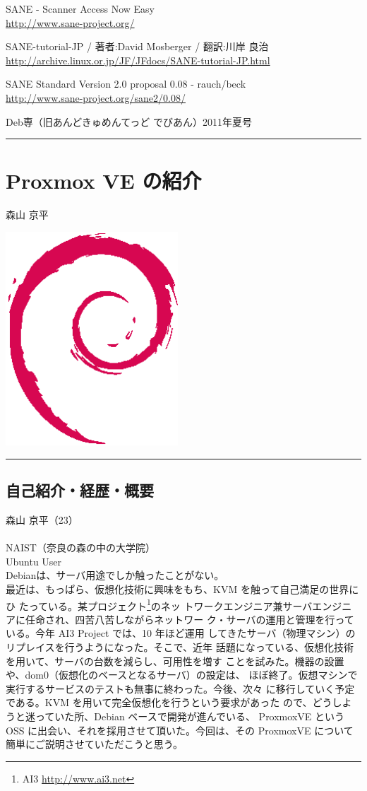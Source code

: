 \documentclass[mingoth,a4paper]{jsarticle}
\renewcommand{\dancersection}[2]{%
\newpage
Deb専（旧あんどきゅめんてっど でびあん）2011年夏号
%
\vspace{0.1mm}\\
{\color{dancerdarkblue}\rule{\hsize}{2mm}}

%
%
\begin{minipage}[t]{0.6\hsize}
\color{dancerdarkblue}
\vspace{1cm}
\section{#1}
\hfill{}#2\\
\end{minipage}
\begin{minipage}[t]{0.4\hsize}
\vspace{-2cm}
\hfill{}\includegraphics[height=8cm]{image200502/openlogo-nd.eps}\\
\vspace{-5cm}
\end{minipage}
%
{\color{dancerlightblue}\rule{0.66\hsize}{2mm}}
%
\vspace{2cm}
}
\begin{document}
\begin{thebibliography}{0}
 SANE - Scanner Access Now Easy \\
\url{http://www.sane-project.org/}

SANE-tutorial-JP / 著者:David Mosberger / 翻訳:川岸 良治\\
\url{http://archive.linux.or.jp/JF/JFdocs/SANE-tutorial-JP.html}

SANE Standard Version 2.0 proposal 0.08 - rauch/beck \\
\url{http://www.sane-project.org/sane2/0.08/}

\end{thebibliography}

\dancersection{Proxmox VE の紹介}{森山 京平}

\label{sec:moriyama}
\subsection{自己紹介・経歴・概要}
森山 京平（23）\\
\\
NAIST（奈良の森の中の大学院）\\
Ubuntu User\\
Debianは、サーバ用途でしか触ったことがない。\\
最近は、もっぱら、仮想化技術に興味をもち、KVM を触って自己満足の世界にひ
たっている。某プロジェクト\footnote{AI3 \url{http://www.ai3.net}}のネッ
トワークエンジニア兼サーバエンジニアに任命され、四苦八苦しながらネットワー
ク・サーバの運用と管理を行っている。今年 AI3 Project では、10 年ほど運用
してきたサーバ（物理マシン）のリプレイスを行うようになった。そこで、近年
話題になっている、仮想化技術を用いて、サーバの台数を減らし、可用性を増す
ことを試みた。機器の設置や、dom0（仮想化のベースとなるサーバ）の設定は、
ほぼ終了。仮想マシンで実行するサービスのテストも無事に終わった。今後、次々
に移行していく予定である。KVM を用いて完全仮想化を行うという要求があった
ので、どうしようと迷っていた所、Debian ベースで開発が進んでいる、
ProxmoxVE という OSS に出会い、それを採用させて頂いた。今回は、その
ProxmoxVE について簡単にご説明させていただこうと思う。
\end{document}
